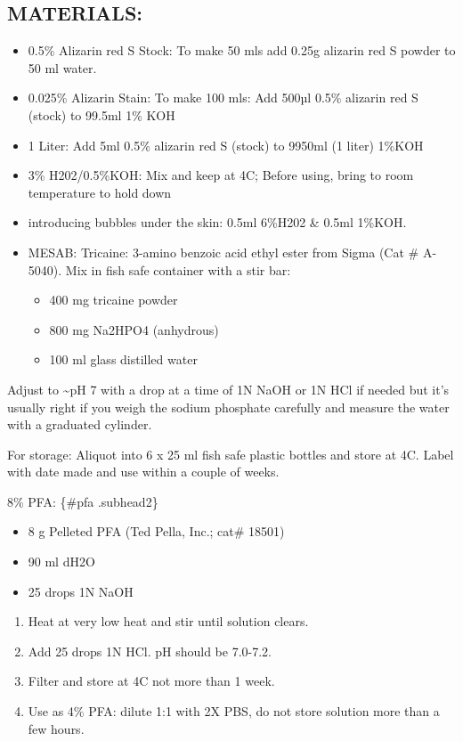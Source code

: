 \documentclass[
]{book}
\providecommand{\tightlist}{%
  \setlength{\itemsep}{0pt}\setlength{\parskip}{0pt}}
\begin{document}
\hypertarget{materials-14}{%
\subsection{MATERIALS:}\label{materials-14}}

\begin{itemize}
\tightlist
\item
  0.5\% Alizarin red S Stock: To make 50 mls add 0.25g alizarin red S powder to 50 ml water.
\item
  0.025\% Alizarin Stain: To make 100 mls: Add 500µl 0.5\% alizarin red S (stock) to 99.5ml 1\% KOH
\item
  1 Liter: Add 5ml 0.5\% alizarin red S (stock) to 9950ml (1 liter) 1\%KOH
\item
  3\% H202/0.5\%KOH: Mix and keep at 4C; Before using, bring to room temperature to hold down
\item
  introducing bubbles under the skin: 0.5ml 6\%H202 \& 0.5ml 1\%KOH.
\item
  MESAB: Tricaine: 3-amino benzoic acid ethyl ester from Sigma (Cat \# A-5040). Mix in fish safe container with a stir bar:

  \begin{itemize}
  \tightlist
  \item
    400 mg tricaine powder
  \item
    800 mg Na2HPO4 (anhydrous)
  \item
    100 ml glass distilled water
  \end{itemize}
\end{itemize}

Adjust to \textasciitilde pH 7 with a drop at a time of 1N NaOH or 1N HCl if needed
but it's usually right if you weigh the sodium phosphate carefully and
measure the water with a graduated cylinder.

For storage: Aliquot into 6 x 25 ml fish safe plastic bottles and store
at 4C. Label with date made and use within a couple of weeks.

8\% PFA: \{\#pfa .subhead2\}

\begin{itemize}
\tightlist
\item
  8 g Pelleted PFA (Ted Pella, Inc.; cat\# 18501)
\item
  90 ml dH2O
\item
  25 drops 1N NaOH
\end{itemize}

\begin{enumerate}
\def\labelenumi{\arabic{enumi}.}
\tightlist
\item
  Heat at very low heat and stir until solution clears.
\item
  Add 25 drops 1N HCl. pH should be 7.0-7.2.
\item
  Filter and store at 4C not more than 1 week.
\item
  Use as 4\% PFA: dilute 1:1 with 2X PBS, do not store solution more
  than a few hours.
\end{enumerate}
\end{document}
